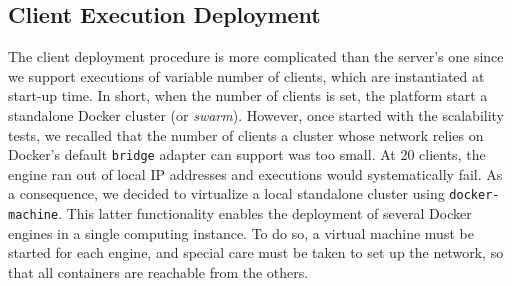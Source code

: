 \subsection{Client Execution Deployment} \label{sec:deployment:client}

The client deployment procedure is more complicated than the server's one since we support executions of variable number of clients, which are instantiated at start-up time.
In short, when the number of clients is set, the platform start a standalone Docker cluster (or \emph{swarm}).
However, once started with the scalability tests, we recalled that the number of clients a cluster whose network relies on Docker's default \texttt{bridge} adapter can support was too small.
At 20 clients, the engine ran out of local IP addresses and executions would systematically fail.
As a consequence, we decided to virtualize a local standalone cluster using \texttt{docker-machine}.
This latter functionality enables the deployment of several Docker engines in a single computing instance.
To do so, a virtual machine must be started for each engine, and special care must be taken to set up the network, so that all containers are reachable from the others.

